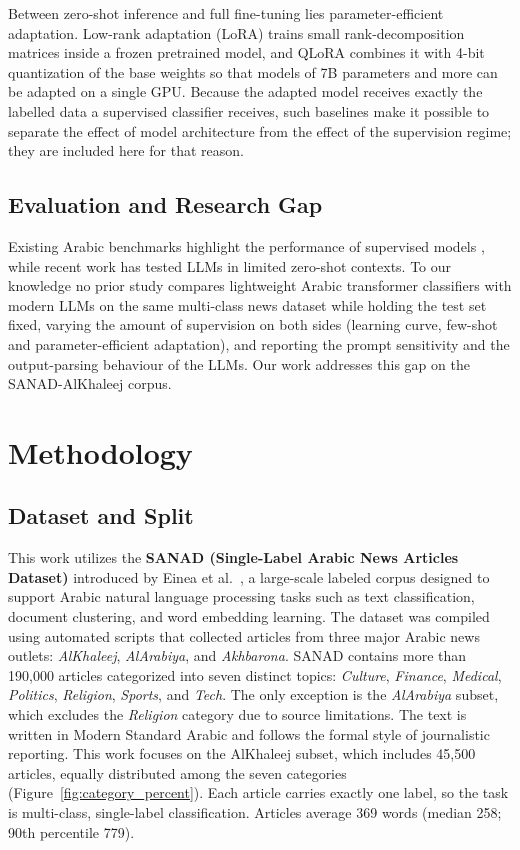 \documentclass[preprint,12pt,authoryear]{elsarticle}
\newif\ifrevmarkup
\DeclareRobustCommand{\rev}[1]{\ifrevmarkup{\color{blue}#1}\else#1\fi}
\begin{document}
\rev{Between zero-shot inference and full fine-tuning lies parameter-efficient adaptation. Low-rank adaptation (LoRA) \cite{hu2022lora} trains small rank-decomposition matrices inside a frozen pretrained model, and QLoRA \cite{dettmers2023qlora} combines it with 4-bit quantization of the base weights so that models of 7B parameters and more can be adapted on a single GPU. Because the adapted model receives exactly the labelled data a supervised classifier receives, such baselines make it possible to separate the effect of model architecture from the effect of the supervision regime; they are included here for that reason.}

\sloppy
\subsection{Evaluation and Research Gap}
Existing Arabic benchmarks highlight the performance of supervised models \cite{nassif2022arabic, elgendy2024toxicity}, while recent work has tested LLMs in limited zero-shot contexts. \rev{To our knowledge no prior study compares lightweight Arabic transformer classifiers with modern LLMs on the same multi-class news dataset while holding the test set fixed, varying the amount of supervision on both sides (learning curve, few-shot and parameter-efficient adaptation), and reporting the prompt sensitivity and the output-parsing behaviour of the LLMs.} Our work addresses this gap on the SANAD-AlKhaleej corpus.

\section{Methodology}
\label{methodology}

\subsection{Dataset and Split}
\label{dataset}

This work utilizes the \textbf{SANAD (Single-Label Arabic News Articles Dataset)} introduced by Einea et al.~\cite{elnagar2020arabic}, a large-scale labeled corpus designed to support Arabic natural language processing tasks such as text classification, document clustering, and word embedding learning. The dataset was compiled using automated scripts that collected articles from three major Arabic news outlets: \textit{AlKhaleej}, \textit{AlArabiya}, and \textit{Akhbarona}. SANAD contains more than 190,000 articles categorized into seven distinct topics: \textit{Culture}, \textit{Finance}, \textit{Medical}, \textit{Politics}, \textit{Religion}, \textit{Sports}, and \textit{Tech}. The only exception is the \textit{AlArabiya} subset, which excludes the \textit{Religion} category due to source limitations. The text is written in Modern Standard Arabic and follows the formal style of journalistic reporting. This work focuses on the AlKhaleej subset, which includes 45,500 articles, equally distributed among the seven categories (Figure~\ref{fig:category_percent}). \rev{Each article carries exactly one label, so the task is multi-class, single-label classification.} Articles average 369 words (median 258; 90th percentile 779).
\end{document}
